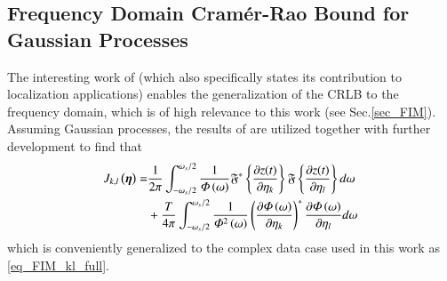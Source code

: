 \subsection{Frequency Domain Cram\'er-Rao Bound for Gaussian Processes}
The interesting work of \cite{zeira1990frequency} (which also specifically states its contribution to localization applications) enables the generalization of the CRLB to the frequency domain, which is of high relevance to this work (see Sec.\ref{sec_FIM}).
Assuming Gaussian processes, the results of \cite{whittle1953analysis} are utilized together with further development to find that 
\begin{equation}\label{eq_FIM_kl_full_REAL}
    {
        \begin{split}
            J_{k,l}\rBrace{\vEta} 
            =&
            \frac{1}{2\pi}
            \int_{-\omega_{s}/2}^{\omega_{s}/2}
            {
            \frac{1}{\Phi\rBrace{\omega}}
            \mathfrak{F}^{*}\left\{
            \frac{\partial z(t)}{\partial\eta_{k}}
            \right\}
            \mathfrak{F}\left\{
            \frac{\partial z(t)}{\partial\eta_{l}}
            \right\}
            d\omega
            }%
            \\ &+
            \frac{T}{4\pi}
            \int_{-\omega_{s}/2}^{\omega_{s}/2}
            \frac{1}{\Phi^{2}\rBrace{\omega}}
            \rBrace{\frac{\partial\Phi\rBrace{\omega}}{\partial\eta_{k}}}^{\ast}
            \frac{\partial\Phi\rBrace{\omega}}{\partial\eta_{l}}
            d\omega
        \end{split}
    }
\end{equation}
which is conveniently generalized to the complex data case used in this work as \eqref{eq_FIM_kl_full}.
